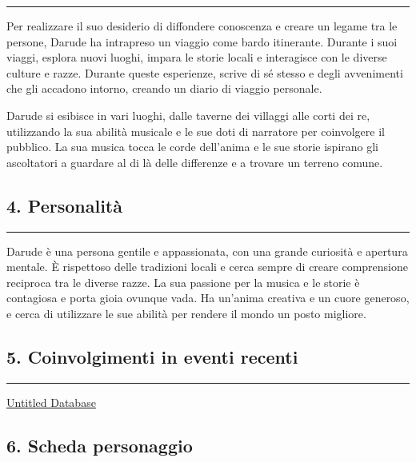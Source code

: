 \begin{center}\rule{0.5\linewidth}{0.5pt}\end{center}

Per realizzare il suo desiderio di diffondere conoscenza e creare un
legame tra le persone, Darude ha intrapreso un viaggio come bardo
itinerante. Durante i suoi viaggi, esplora nuovi luoghi, impara le
storie locali e interagisce con le diverse culture e razze. Durante
queste esperienze, scrive di sé stesso e degli avvenimenti che gli
accadono intorno, creando un diario di viaggio personale.

Darude si esibisce in vari luoghi, dalle taverne dei villaggi alle corti
dei re, utilizzando la sua abilità musicale e le sue doti di narratore
per coinvolgere il pubblico. La sua musica tocca le corde dell'anima e
le sue storie ispirano gli ascoltatori a guardare al di là delle
differenze e a trovare un terreno comune.

\subsection{4. Personalità}\label{personalituxe0}

\begin{center}\rule{0.5\linewidth}{0.5pt}\end{center}

Darude è una persona gentile e appassionata, con una grande curiosità e
apertura mentale. È rispettoso delle tradizioni locali e cerca sempre di
creare comprensione reciproca tra le diverse razze. La sua passione per
la musica e le storie è contagiosa e porta gioia ovunque vada. Ha
un'anima creativa e un cuore generoso, e cerca di utilizzare le sue
abilità per rendere il mondo un posto migliore.

\subsection{5. Coinvolgimenti in eventi
recenti}\label{coinvolgimenti-in-eventi-recenti}

\begin{center}\rule{0.5\linewidth}{0.5pt}\end{center}

\href{Untitled\%20Database\%2010a4f1e9c7344928a299d9fa00635f6b.csv}{Untitled
Database}

\subsection{6. Scheda personaggio}\label{scheda-personaggio}

